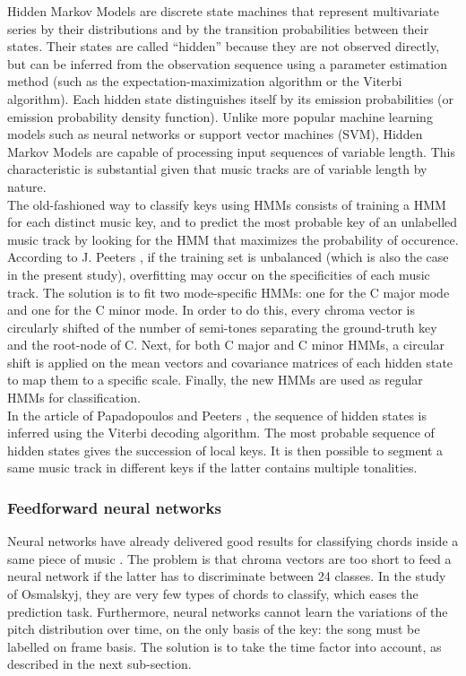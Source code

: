 \documentclass[letterpaper]{article}
\begin{document}
Hidden Markov Models are discrete state machines that represent multivariate series by their distributions and by
the transition probabilities between their states. Their states are called “hidden” because they are not observed directly,
but can be inferred from the observation sequence using a parameter estimation method (such as the expectation-maximization algorithm
or the Viterbi algorithm). Each hidden state distinguishes itself by its emission probabilities (or emission probability density function).
Unlike more popular machine learning models such as neural networks or support vector machines (SVM), Hidden Markov Models are capable of
processing input sequences of variable length. This characteristic is substantial given that music tracks are of variable length by nature\citep{DR}. \\

The old-fashioned way to classify keys using HMMs consists of training a HMM for each distinct music key, and to predict the most probable 
key of an unlabelled music track by looking for the HMM that maximizes the probability of occurence.  \\

According to J. Peeters \citep{JP}, if the training set is unbalanced (which is also the case in the present study), overfitting may occur on the specificities
of each music track. The solution is to fit two mode-specific HMMs: one for the C major mode and one for the C minor mode. In order to do this, every chroma vector is circularly shifted of the number of semi-tones separating the ground-truth key and the root-node of C. Next, for both C major and C minor HMMs, a circular shift is applied on the mean vectors and covariance matrices of each hidden state to map them to a specific scale. Finally, the new HMMs are used as regular HMMs for classification.\\

In the article of Papadopoulos and Peeters \citep{PP}, the sequence of hidden states is inferred using the Viterbi decoding algorithm. The most probable sequence of hidden states gives the succession of local keys. It is then possible to segment a same music track in different keys if the latter contains multiple tonalities.

\subsubsection{Feedforward neural networks}

Neural networks have already delivered good results for classifying chords inside a same piece of music \citep{JO}.
The problem is that chroma vectors are too short to feed a neural network if the latter has to discriminate between 24 classes. In the study of Osmalskyj, 
they are very few types of chords to classify, which eases the prediction task. Furthermore, neural networks cannot learn the variations of the pitch distribution over time, on the only basis of the key: the song must be labelled on frame basis. The solution is to take the time factor into account, as described in the next sub-section.
\end{document}

